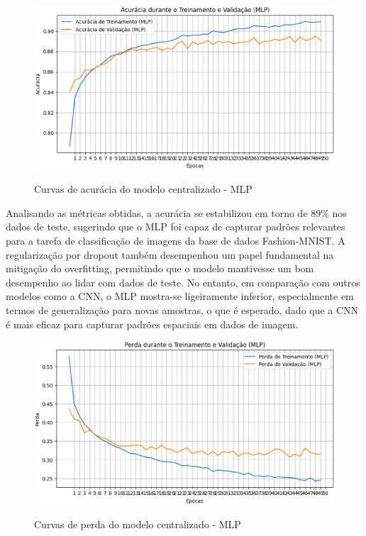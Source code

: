 \begin{figure}[ht]
    \centering
    \caption{Curvas de acurácia do modelo centralizado - MLP}
    \includegraphics[scale=0.4]{figuras/analiseResultados/acuracyMLP.eps}
    \label{fig:acuracyMLP}
\end{figure}

Analisando as métricas obtidas, a acurácia se estabilizou em torno de 89\% nos dados de teste, sugerindo que o MLP foi capaz de capturar padrões relevantes para a tarefa de classificação de imagens da base de dados Fashion-MNIST. A regularização por dropout também desempenhou um papel fundamental na mitigação do overfitting, permitindo que o modelo mantivesse um bom desempenho ao lidar com dados de teste. No entanto, em comparação com outros modelos como a CNN, o MLP mostra-se ligeiramente inferior, especialmente em termos de generalização para novas amostras, o que é esperado, dado que a CNN é mais eficaz para capturar padrões espaciais em dados de imagem.

\begin{figure}[ht]
    \centering
    \caption{Curvas de perda do modelo centralizado - MLP}
    \includegraphics[scale=0.4]{figuras/analiseResultados/lossMLP.eps}
    \label{fig:lossMLP}
\end{figure}

